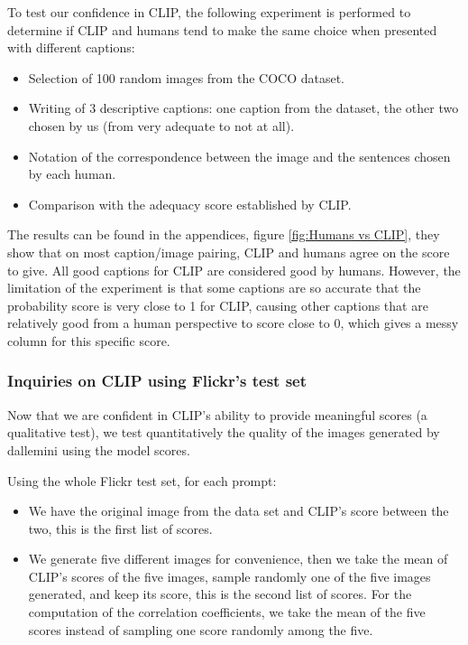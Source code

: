 \documentclass{article}
\begin{document}
\begin{multicols}{2}


To test our confidence in CLIP, the following experiment is performed to determine if CLIP and humans tend to make the same choice when presented with different captions: 
\begin{itemize}
  \item Selection of 100 random images from the COCO dataset.
  \item Writing of 3 descriptive captions: one caption from the dataset, the other two chosen by us (from very adequate to not at all).
  \item Notation of the correspondence between the image and the sentences chosen by each human.
  \item Comparison with the adequacy score established by CLIP.
\end{itemize}

The results can be found in the appendices, figure \ref{fig:Humans vs CLIP}, they show that on most caption/image pairing, CLIP and humans agree on the score to give. All good captions for CLIP are considered good by humans. However, the limitation of the experiment is that some captions are so accurate that the probability score is very close to 1 for CLIP, causing other captions that are relatively good from a human perspective to score close to 0, which gives a messy column for this specific score.

\subsubsection{Inquiries on CLIP using Flickr's test set}

Now that we are confident in CLIP's ability to provide meaningful scores (a qualitative test), we test quantitatively the quality of the images generated by \gls{dallemini} using the model scores. 

Using the whole Flickr test set, for each prompt: 
\begin{itemize}
    \item We have the original image from the data set and CLIP's score between the two, this is the first list of scores.
    \item We generate five different images for convenience, then we take the mean of CLIP's scores of the five images, sample randomly one of the five images generated, and keep its score, this is the second list of scores. For the computation of the correlation coefficients, we take the mean of the five scores instead of sampling one score randomly among the five. 
\end{itemize}


\end{multicols}
\end{document}
